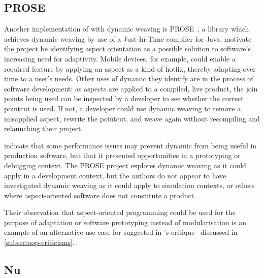 

\subsection{PROSE}

Another implementation of \aop{} with dynamic weaving is
PROSE~\cite{popovici2002PROSE,popovici2003JITaspects}, a library which achieves
dynamic weaving by use of a Just-In-Time compiler for Java.
\citeauthor{popovici2002PROSE} motivate the project be identifying aspect
orientation as a possible solution to software's increasing need for adaptivity.
Mobile devices, for example, could enable a required feature by applying an
aspect as a kind of hotfix, thereby adapting over time to a user's needs. Other
uses of dynamic \aspectorientation{} they identify are in the process of
software development: as aspects are applied to a compiled, live product, the
join points being used can be inspected by a developer to see whether the
correct pointcut is used. If not, a developer could use dynamic weaving to
remove a misapplied aspect, rewrite the pointcut, and weave again without
recompiling and relaunching their project.

\citet{popovici2003JITaspects} indicate that some performance issues may prevent
dynamic \aspectorientation{} from being useful in production software, but that
it presented opportunities in a prototyping or debugging context. The PROSE
project explores dynamic weaving as it could apply in a development context, but
the authors do not appear to have investigated dynamic weaving as it could apply
to simulation contexts, or others where aspect-oriented software does not
constitute a product.

Their observation that aspect-oriented programming could be used for the purpose
of adaptation or software prototyping instead of modularisation is an example of
an alternative use case for \aspectorientation{} suggested in
\citeauthor{steimann06paradoxical}'s critique~\cite{steimann06paradoxical}
discussed in \cref{subsec:aop-criticisms}.



\subsection{Nu}

